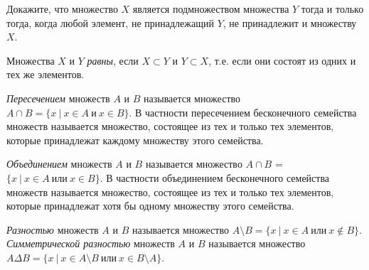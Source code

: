 \begin{ex}\label{5.0 u2}
Докажите, что множество $X$ является подмножеством множества $Y$ тогда и только тогда, когда любой элемент, не принадлежащий $Y$, не принадлежит и множеству $X$.
\end{ex}

\begin{dfn}
Множества $X$ и $Y$ \textit{равны}, если $X \subset Y$ и $Y \subset X$, т.е. если они состоят из одних и тех же элементов.
\end{dfn}

\begin{dfn}
\textit{Пересечением} множеств $A$ и $B$ называется множество $A \cap B = \{x~|~x \in A~\textit{и}~x \in B\}$. В частности пересечением бесконечного семейства множеств называется множество, состоящее из тех и только тех элементов, которые принадлежат каждому множеству этого семейства.
\end{dfn}

\begin{dfn}
\textit{Объединением} множеств $A$ и $B$ называется множество $A \cap B$ = $\{x~|~x \in A~\textit{или}~x \in B\}$. В частности объединением бесконечного семейства множеств называется множество, состоящее из тех и только тех элементов, которые принадлежат хотя бы одному множеству этого семейства.
\end{dfn}

\begin{dfn}
\textit{Разностью} множеств $A$ и $B$ называется множество $A \setminus B = \{x~|~x \in A~\textit{или}~x \notin B\}$.
\textit{Симметрической разностью} множеств $A$ и $B$ называется множество $A \Delta B = \{x~|~x \in A \setminus B~\textit{или}~x \in B \setminus A\}$.
\end{dfn}

